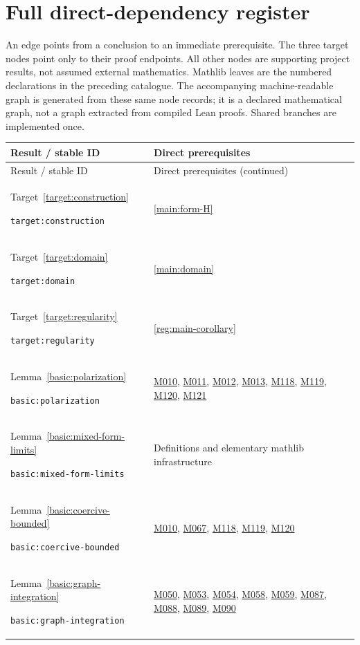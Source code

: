 \documentclass[11pt,a4paper]{article}
\theoremstyle{definition}
\theoremstyle{remark}
\begin{document}
\section{Full direct-dependency register}
\label{sec:dependency-register}
An edge points from a conclusion to an immediate prerequisite. The
three target nodes point only to their proof endpoints. All other nodes
are supporting project results, not assumed external mathematics.
Mathlib leaves are the numbered declarations in the preceding catalogue.
The accompanying machine-readable graph is generated from these same
node records; it is a declared mathematical graph, not a graph extracted
from compiled Lean proofs. Shared branches are implemented once.
\begingroup\small
\begin{longtable}{@{}p{}p{}@{}}
\toprule Result / stable ID & Direct prerequisites \\ \midrule
\endfirsthead
\toprule Result / stable ID & Direct prerequisites (continued) \\ \midrule
\endhead
\bottomrule\endfoot
Target~\ref{target:construction}\par\nolinkurl{target:construction} & \ref{main:form-H} \\[4pt]
Target~\ref{target:domain}\par\nolinkurl{target:domain} & \ref{main:domain} \\[4pt]
Target~\ref{target:regularity}\par\nolinkurl{target:regularity} & \ref{reg:main-corollary} \\[4pt]
Lemma~\ref{basic:polarization}\par\nolinkurl{basic:polarization} & \hyperref[base:M010]{M010}, \hyperref[base:M011]{M011}, \hyperref[base:M012]{M012}, \hyperref[base:M013]{M013}, \hyperref[base:M118]{M118}, \hyperref[base:M119]{M119}, \hyperref[base:M120]{M120}, \hyperref[base:M121]{M121} \\[4pt]
Lemma~\ref{basic:mixed-form-limits}\par\nolinkurl{basic:mixed-form-limits} & Definitions and elementary mathlib infrastructure \\[4pt]
Lemma~\ref{basic:coercive-bounded}\par\nolinkurl{basic:coercive-bounded} & \hyperref[base:M010]{M010}, \hyperref[base:M067]{M067}, \hyperref[base:M118]{M118}, \hyperref[base:M119]{M119}, \hyperref[base:M120]{M120} \\[4pt]
Lemma~\ref{basic:graph-integration}\par\nolinkurl{basic:graph-integration} & \hyperref[base:M050]{M050}, \hyperref[base:M053]{M053}, \hyperref[base:M054]{M054}, \hyperref[base:M058]{M058}, \hyperref[base:M059]{M059}, \hyperref[base:M087]{M087}, \hyperref[base:M088]{M088}, \hyperref[base:M089]{M089}, \hyperref[base:M090]{M090} \\[4pt]

\end{longtable}
\end{document}
